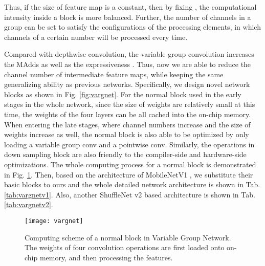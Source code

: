 \documentclass{article}
\begin{document}
Thus, if the size of feature map is a constant, then by fixing , the computational intensity inside a block is more balanced. Further, the number of channels in a group can be set to satisfy the configurations of the processing elements, in which channels of a certain number will be processed every time.

Compared with depthwise convolution, the variable group convolution increases the MAdds as well as the expressiveness \cite{sandler2018mobilenetv2}. Thus, now we are able to reduce the channel number of intermediate feature maps, while keeping the same generalizing ability as previous networks. Specifically, we design novel network blocks as shown in Fig. \ref{fig:vargnet}. For the normal block used in the early stages in the whole network, since the size of weights are relatively small at this time, the weights of the four layers can be all cached into the on-chip memory. When entering the late stages, where channel numbers increase and the size of weights increase as well, the normal block is also able to be optimized by only loading a variable group conv and a pointwise conv. Similarly, the operations in down sampling block are also friendly to the compiler-side and hardware-side optimizations. 
The whole computing process for a normal block is demonstrated in Fig. \ref{fig:compute}.
Then, based on the architecture of MobileNetV1 \cite{howard2017mobilenets}, we substitute their basic blocks to ours and the whole detailed network architecture is shown in Tab. \ref{tab:vargnetv1}. Also, another ShuffleNet v2 based architecture is shown in Tab. \ref{tab:vargnetv2}.


\begin{figure}
  \centering
  \texttt{[image: vargnet]}
  \caption{Computing scheme of a normal block in Variable Group Network. The weights of four convolution operations are first loaded onto on-chip memory, and then processing the features.} \label{fig:compute}
\end{figure}
\end{document}
